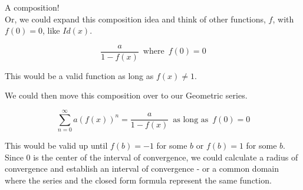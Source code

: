 \documentclass{ximera}
\begin{document}
 A composition! \\




Or, we could expand this composition idea and think of other functions, $f$, with $f(0) = 0$, like $Id(x)$.



\[    \frac{a}{1-f(x)}   \, \text{ where } \, f(0) = 0       \]


This would be a valid function as long as $f(x) \ne 1$. 




We could then move this composition over to our Geometric series.




\[   \sum_{n=0}^{\infty} a (f(x))^n =  \frac{a}{1-f(x)}   \, \text{ as long as } \, f(0) = 0       \]


This would be valid up until $f(b)=-1$ for some $b$ or $f(b)=1$ for some $b$.  Since $0$ is the center of the interval of convergence, we could calculate a radius of convergence and establish an interval of convergence - or a common domain where the series and the closed form formula represent the same function.
\end{document}
